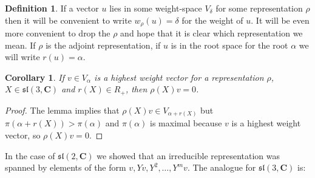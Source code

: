 \documentclass[12pt]{article}
\newcommand{\CC}{\mathbf{C}}
\newtheorem{cor}[thm]{Corollary}
\theoremstyle{definition}
\newtheorem{dfn}[thm]{Definition}
\theoremstyle{check}
\theoremstyle{remark}
\theoremstyle{TheoremNum}
\begin{document}
\slhwv

\begin{dfn}
If a vector $u$ lies in some weight-space $V_{\delta}$ for some representation $\rho$ then it will be convenient to write $w_{\rho}(u)=\delta$ for the weight of $u$. It will be even more convenient to drop the $\rho$ and hope that it is clear which representation we mean. If $\rho$ is the adjoint representation, if $u$ is in the root space for the root $\alpha$ we will write $r(u)=\alpha$.
\end{dfn}

\begin{cor}
If $v\in V_{\alpha}$ is a highest weight vector for a representation $\rho$, $X\in\mathfrak{sl}(3,\CC)$ and $r(X)\in R_+$, then $\rho(X)v=0$.
\end{cor}
\begin{proof}
The lemma implies that $\rho(X)v\in V_{\alpha+r(X)}$ but $\pi(\alpha+r(X))>\pi(\alpha)$ and $\pi(\alpha)$ is maximal because $v$ is a highest weight vector, so $\rho(X)v=0$.
\end{proof}

In the case of $\mathfrak{sl}(2,\CC)$ we showed that an irreducible representation was spanned by elements of the form $v,Yv,Y^2,\ldots, Y^mv$. The analogue for $\mathfrak{sl}(3,\CC)$ is:
\end{document}
